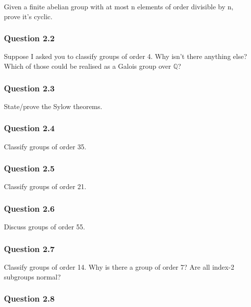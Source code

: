 Given a finite abelian group with at most n elements of order divisible
by n, prove it's cyclic.

\hypertarget{question-2.2}{%
\subsubsection{Question 2.2}\label{question-2.2}}

Suppose I asked you to classify groups of order 4. Why isn't there
anything else? Which of those could be realised as a Galois group over
\({\mathbb{Q}}\)?

\hypertarget{question-2.3}{%
\subsubsection{Question 2.3}\label{question-2.3}}

State/prove the Sylow theorems.

\hypertarget{question-2.4}{%
\subsubsection{Question 2.4}\label{question-2.4}}

Classify groups of order 35.

\hypertarget{question-2.5}{%
\subsubsection{Question 2.5}\label{question-2.5}}

Classify groups of order 21.

\hypertarget{question-2.6}{%
\subsubsection{Question 2.6}\label{question-2.6}}

Discuss groups of order 55.

\hypertarget{question-2.7}{%
\subsubsection{Question 2.7}\label{question-2.7}}

Classify groups of order 14. Why is there a group of order 7? Are all
index-2 subgroups normal?

\hypertarget{question-2.8}{%
\subsubsection{Question 2.8}\label{question-2.8}}


